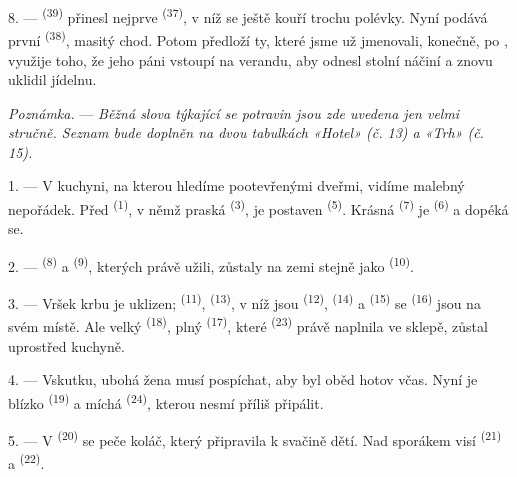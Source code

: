 8. ---  \textsuperscript{(39)} přinesl nejprve 
\textsuperscript{(37)}, v níž se ještě kouří trochu polévky. Nyní podává první
 \textsuperscript{(38)}, masitý chod. Potom předloží ty, které jsme už
jmenovali, konečně, po , využije toho, že jeho páni vstoupí na verandu, aby
odnesl stolní náčiní a znovu uklidil jídelnu.

\textit{Poznámka.} --- \textit{Běžná slova týkající se potravin jsou zde uvedena jen velmi
stručně. Seznam bude doplněn na dvou tabulkách «Hotel» (č. 13) a «Trh» (č. 15).}

\VUsaut{4.6mm}
\VUsaut{3.0mm}

1. --- V kuchyni, na kterou hledíme pootevřenými dveřmi, vidíme malebný nepořádek. Před
 \textsuperscript{(1)}, v němž praská 
\textsuperscript{(3)}, je postaven  \textsuperscript{(5)}. Krásná
 \textsuperscript{(7)} je 
\textsuperscript{(6)} a dopéká se.

2. ---  \textsuperscript{(8)} a  \textsuperscript{(9)},
kterých právě užili, zůstaly na zemi stejně jako
 \textsuperscript{(10)}.

3. --- Vršek krbu je uklizen;  \textsuperscript{(11)},
 \textsuperscript{(13)}, v níž jsou 
\textsuperscript{(12)},  \textsuperscript{(14)} a 
\textsuperscript{(15)} se  \textsuperscript{(16)} jsou na svém místě. Ale
velký  \textsuperscript{(18)}, plný 
\textsuperscript{(17)}, které  \textsuperscript{(23)} právě naplnila ve
sklepě, zůstal uprostřed kuchyně.

4. --- Vskutku, ubohá žena musí pospíchat, aby byl oběd hotov včas. Nyní je blízko
 \textsuperscript{(19)} a míchá 
\textsuperscript{(24)}, kterou nesmí příliš připálit.

5. --- V  \textsuperscript{(20)} se peče koláč, který připravila k svačině
dětí. Nad sporákem visí  \textsuperscript{(21)} a
 \textsuperscript{(22)}.

\VUsaut{4.0mm}
\VUsaut{3.0mm}

